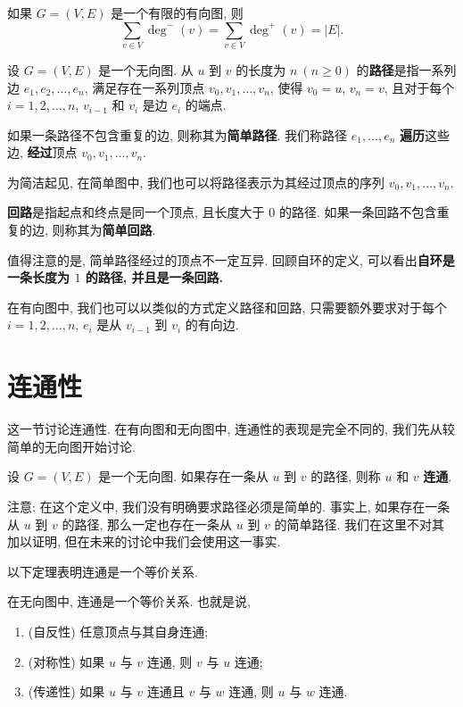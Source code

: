 \begin{theorem}
    如果 $G=(V,E)$ 是一个有限的有向图, 则 \[\sum_{v\in V}\deg^-(v)=\sum_{v\in V}\deg^+(v)=|E|.\]
\end{theorem}

\begin{definition}[路径]
    设 $G=(V,E)$ 是一个无向图. 从 $u$ 到 $v$ 的长度为 $n\ (n\geq 0)$ 的\textbf{路径}是指一系列边 $e_1,e_2,\dots,e_n$, 满足存在一系列顶点 $v_0,v_1,\dots,v_n$, 使得 $v_0=u$, $v_n=v$, 且对于每个 $i=1,2,\dots,n$, $v_{i-1}$ 和 $v_i$ 是边 $e_i$ 的端点.

    如果一条路径不包含重复的边, 则称其为\textbf{简单路径}. 我们称路径 $e_1,\dots,e_n$ \textbf{遍历}这些边, \textbf{经过}顶点 $v_0,v_1,\dots,v_n$.
\end{definition}

为简洁起见, 在简单图中, 我们也可以将路径表示为其经过顶点的序列 $v_0,v_1,\dots,v_n$.

\begin{definition}[回路]
    \textbf{回路}是指起点和终点是同一个顶点, 且长度大于 $0$ 的路径. 如果一条回路不包含重复的边, 则称其为\textbf{简单回路}.
\end{definition}

值得注意的是, 简单路径经过的顶点不一定互异. 回顾自环的定义, 可以看出\textbf{自环是一条长度为 $1$ 的路径, 并且是一条回路.}

在有向图中, 我们也可以以类似的方式定义路径和回路, 只需要额外要求对于每个 $i=1,2,\dots,n$, $e_i$ 是从 $v_{i-1}$ 到 $v_i$ 的有向边.

\section{连通性}\label{sec:Connectivity}
这一节讨论连通性. 在有向图和无向图中, 连通性的表现是完全不同的, 我们先从较简单的无向图开始讨论.

\begin{definition}
    设 $G=(V,E)$ 是一个无向图. 如果存在一条从 $u$ 到 $v$ 的路径, 则称 $u$ 和 $v$ \textbf{连通}.
\end{definition}

注意: 在这个定义中, 我们没有明确要求路径必须是简单的. 事实上, 如果存在一条从 $u$ 到 $v$ 的路径, 那么一定也存在一条从 $u$ 到 $v$ 的简单路径. 我们在这里不对其加以证明, 但在未来的讨论中我们会使用这一事实. 

以下定理表明连通是一个等价关系. 

\begin{theorem}
    在无向图中, 连通是一个等价关系. 也就是说,
    \begin{enumerate}[itemindent=0ex, itemsep=0pt, label=\upshape{(\alph*)}]
        \item (自反性) 任意顶点与其自身连通;
        \item (对称性) 如果 $u$ 与 $v$ 连通, 则 $v$ 与 $u$ 连通;
        \item (传递性) 如果 $u$ 与 $v$ 连通且 $v$ 与 $w$ 连通, 则 $u$ 与 $w$ 连通.
    \end{enumerate}
\end{theorem}

